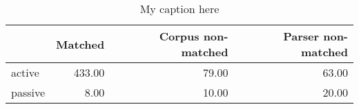 \begin{table}[!ht]
\centering
\begin{tabular}{lrrr}
\toprule
{} &  Matched &  Corpus non-matched &  Parser non-matched \\
\midrule
active  &   433.00 &               79.00 &               63.00 \\
passive &     8.00 &               10.00 &               20.00 \\
\bottomrule
\end{tabular}
\caption{My caption here}
\label{tab:VOICE-ocd-data}
\end{table}
